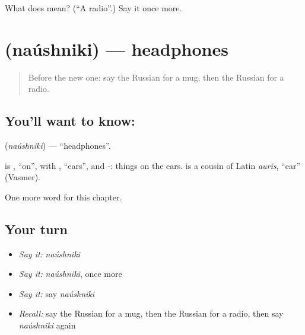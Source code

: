 \begin{tcolorbox}[breakable,colback=teal!4,colframe=teal!35!black,title={Before you move on}]
What does  mean? (\textquotedblleft{}A radio\textquotedblright{}.) Say it once more.
\end{tcolorbox}
\section[\texorpdfstring{\ru{наушники} (naúshniki)}{наушники (naúshniki)}]{ (naúshniki) — headphones}

\label{lesson:RU-C247-naushniki}



\begin{quote}
Before the new one: say the Russian for a mug, then the Russian for a radio.
\end{quote}

\subsection*{You'll want to know: }
\textbf{} (\emph{naúshniki}) — \textquotedblleft{}headphones\textquotedblright{}.

\begin{cousinweb}
\textbf{} is \emph{}, \textquotedblleft{}on\textquotedblright{}, with \emph{}, \textquotedblleft{}ears\textquotedblright{}, and \emph{-}: things on the ears. \emph{} is a cousin of Latin \emph{auris}, \textquotedblleft{}ear\textquotedblright{} (Vasmer).
\end{cousinweb}

\begin{grammarlens}[title={What you've built}]
One more word for this chapter.
\end{grammarlens}

\subsection*{Your turn}
\begin{itemize}
\raggedright
  \item \emph{Say it:} \emph{naúshniki}
  \item \emph{Say it:} \emph{naúshniki}, once more
  \item \emph{Say it:} say \emph{naúshniki}
  \item \emph{Recall:} say the Russian for a mug, then the Russian for a radio, then say \emph{naúshniki} again
\end{itemize}

